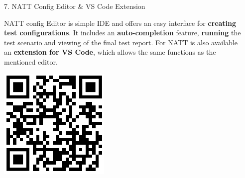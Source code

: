 \documentclass[final]{beamer}
\newlength{\sepwidth}
\newlength{\colwidth}
\newcommand{\separatorcolumn}{\begin{column}{\sepwidth}\end{column}}
\begin{document}
\begin{frame}[t]
\begin{columns}[t]
\begin{column}{\colwidth}
\begin{block}{7. NATT Config Editor \& VS Code Extension}
    \begin{minipage}{0.7\textwidth}
      NATT config Editor is simple IDE and offers an easy interface for \textbf{creating test configurations}. It includes an 
      \textbf{auto-completion} feature, \textbf{running} the test scenario and viewing of the final test report. For NATT is 
      also available an \textbf{extension for VS Code}, which allows the same functions as the mentioned editor.
    \end{minipage}
    \hfill
    \noindent\begin{minipage}{0.25\textwidth}
      \includegraphics[width=\textwidth]{./imgs/github-qr.png}
    \end{minipage}

  \end{block}

\end{column}

\separatorcolumn
\end{columns}
\end{frame}
\end{document}

